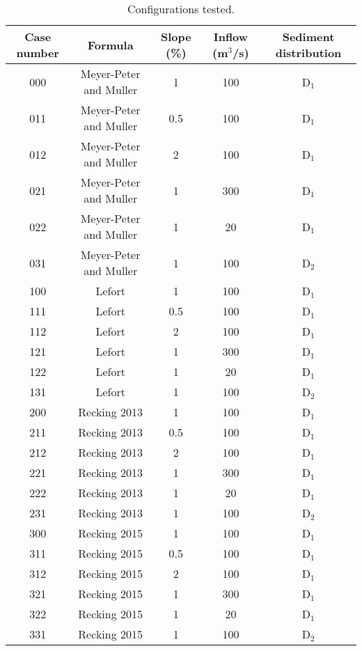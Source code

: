 \begin{table}[h] %
\begin{center}
\caption{Configurations tested.\label{tab:formulea:config}} %
\begin{tabular}{|c|c|c|c|c|} %

\hline %
Case number & Formula & Slope (\%) & Inflow (m$^3$/s) & Sediment distribution\\
\hline
000 & Meyer-Peter and Muller & 1 & 100 & D$_1$\\
\hline
011 & Meyer-Peter and Muller & 0.5 & 100 & D$_1$\\
\hline
012 & Meyer-Peter and Muller & 2 & 100 & D$_1$\\
\hline
021 & Meyer-Peter and Muller & 1 & 300 & D$_1$\\
\hline
022 & Meyer-Peter and Muller & 1 & 20 & D$_1$\\
\hline
031 & Meyer-Peter and Muller & 1 & 100 & D$_2$\\
\hline
100 & Lefort & 1 & 100 & D$_1$\\
\hline
111 & Lefort & 0.5 & 100 & D$_1$\\
\hline
112 & Lefort & 2 & 100 & D$_1$\\
\hline
121 & Lefort & 1 & 300 & D$_1$\\
\hline
122 & Lefort & 1 & 20 & D$_1$\\
\hline
131 & Lefort & 1 & 100 & D$_2$\\
\hline
200 & Recking 2013 & 1 & 100 & D$_1$\\
\hline
211 & Recking 2013 & 0.5 & 100 & D$_1$\\
\hline
212 & Recking 2013 & 2 & 100 & D$_1$\\
\hline
221 & Recking 2013 & 1 & 300 & D$_1$\\
\hline
222 & Recking 2013 & 1 & 20 & D$_1$\\
\hline
231 & Recking 2013 & 1 & 100 & D$_2$\\
\hline
300 & Recking 2015 & 1 & 100 & D$_1$\\
\hline
311 & Recking 2015 & 0.5 & 100 & D$_1$\\
\hline
312 & Recking 2015 & 2 & 100 & D$_1$\\
\hline
321 & Recking 2015 & 1 & 300 & D$_1$\\
\hline
322 & Recking 2015 & 1 & 20 & D$_1$\\
\hline
331 & Recking 2015 & 1 & 100 & D$_2$\\
\hline
\end{tabular}
\end{center}
\end{table}

